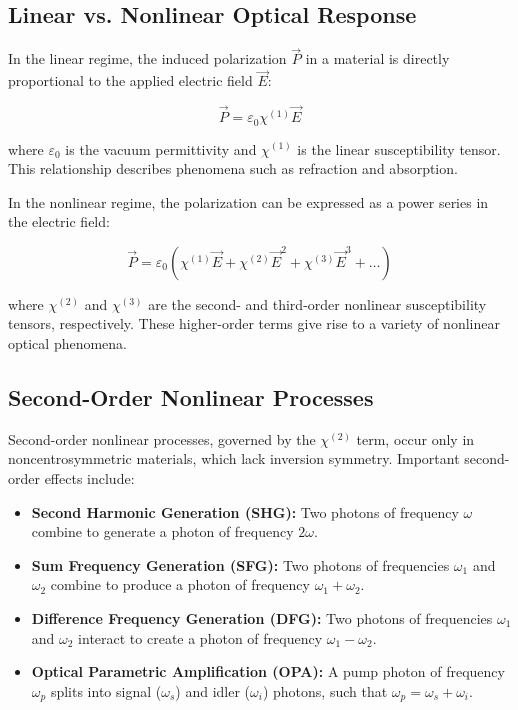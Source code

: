 \subsection{Linear vs. Nonlinear Optical Response}
\label{subsec:linear_vs_nonlinear}

\noindent In the linear regime, the induced polarization $\vec{P}$ in a material is directly proportional to the applied electric field $\vec{E}$:

\begin{equation}
    \vec{P} = \varepsilon_0 \chi^{(1)} \vec{E}
    \label{eq:linear_polarization}
\end{equation}

\noindent where $\varepsilon_0$ is the vacuum permittivity and $\chi^{(1)}$ is the linear susceptibility tensor. This relationship describes phenomena such as refraction and absorption.

\noindent In the nonlinear regime, the polarization can be expressed as a power series in the electric field:

\begin{equation}
    \vec{P} = \varepsilon_0 (\chi^{(1)} \vec{E} + \chi^{(2)} \vec{E}^2 + \chi^{(3)} \vec{E}^3 + \ldots)
    \label{eq:nonlinear_polarization}
\end{equation}

\noindent where $\chi^{(2)}$ and $\chi^{(3)}$ are the second- and third-order nonlinear susceptibility tensors, respectively. These higher-order terms give rise to a variety of nonlinear optical phenomena.

\subsection{Second-Order Nonlinear Processes}
\label{subsec:second_order}

\noindent Second-order nonlinear processes, governed by the $\chi^{(2)}$ term, occur only in noncentrosymmetric materials, which lack inversion symmetry. Important second-order effects include:

\begin{itemize}
    \item \textbf{Second Harmonic Generation (SHG):} Two photons of frequency $\omega$ combine to generate a photon of frequency $2\omega$.
    \item \textbf{Sum Frequency Generation (SFG):} Two photons of frequencies $\omega_1$ and $\omega_2$ combine to produce a photon of frequency $\omega_1 + \omega_2$.
    \item \textbf{Difference Frequency Generation (DFG):} Two photons of frequencies $\omega_1$ and $\omega_2$ interact to create a photon of frequency $\omega_1 - \omega_2$.
    \item \textbf{Optical Parametric Amplification (OPA):} A pump photon of frequency $\omega_p$ splits into signal ($\omega_s$) and idler ($\omega_i$) photons, such that $\omega_p = \omega_s + \omega_i$.
\end{itemize}

